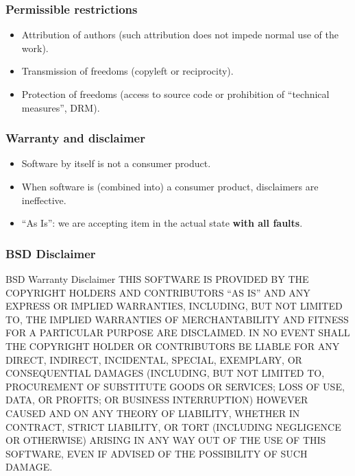 \begin{frame}
\frametitle{Permissible restrictions}
\begin{itemize}
    \item Attribution of authors (such attribution does not impede normal use of the work).
    \item Transmission of freedoms (copyleft or reciprocity).
    \item Protection of freedoms (access to source code or prohibition of ``technical measures'', DRM). 
\end{itemize}

\end{frame}

\begin{frame}
\frametitle{Warranty and disclaimer}
\begin{itemize}
    \item Software by itself is not a consumer product.
    \item When software is (combined into) a consumer product, disclaimers are ineffective.
    \item ``As Is'': we are accepting item in the actual state \textbf{with all faults}.
\end{itemize}

\end{frame}
 
\begin{frame}
\frametitle{BSD Disclaimer}

\begin{block}{BSD Warranty Disclaimer}
\small{THIS SOFTWARE IS PROVIDED BY THE COPYRIGHT HOLDERS AND CONTRIBUTORS ``AS IS'' AND ANY EXPRESS OR IMPLIED WARRANTIES, INCLUDING, BUT NOT LIMITED TO, THE IMPLIED WARRANTIES OF MERCHANTABILITY AND FITNESS FOR A PARTICULAR PURPOSE ARE DISCLAIMED. IN NO EVENT SHALL THE COPYRIGHT HOLDER OR CONTRIBUTORS BE LIABLE FOR ANY DIRECT, INDIRECT, INCIDENTAL, SPECIAL, EXEMPLARY, OR CONSEQUENTIAL DAMAGES (INCLUDING, BUT NOT LIMITED TO, PROCUREMENT OF SUBSTITUTE GOODS OR SERVICES; LOSS OF USE, DATA, OR PROFITS; OR BUSINESS INTERRUPTION) HOWEVER CAUSED AND ON ANY THEORY OF LIABILITY, WHETHER IN CONTRACT, STRICT LIABILITY, OR TORT (INCLUDING NEGLIGENCE OR OTHERWISE) ARISING IN ANY WAY OUT OF THE USE OF THIS SOFTWARE, EVEN IF ADVISED OF THE POSSIBILITY OF SUCH DAMAGE.}
\end{block}

\end{frame}



